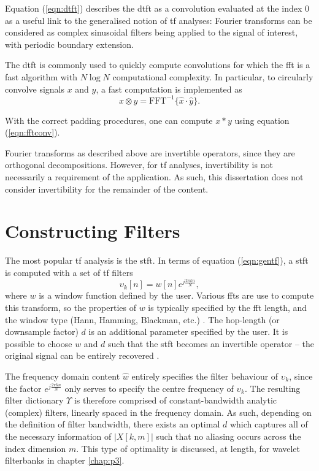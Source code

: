 Equation (\ref{eqn:dtft}) describes the \ac{dtft} as a convolution evaluated at the index 0 as a useful link to the generalised notion of \ac{tf} analyses: Fourier transforms can be considered as complex sinusoidal filters being applied to the signal of interest, with periodic boundary extension.

The \ac{dtft} is commonly used to quickly compute convolutions for which the \ac{fft} is a fast algorithm with $N \log N$ computational complexity. In particular, to circularly convolve signals $x$ and $y$, a fast computation is implemented as
\begin{equation}
    \label{eqn:fftconv}
    x \otimes y = \text{FFT}^{-1}\{\hat{x} \cdot \hat{y}\}.
\end{equation}

With the correct padding procedures, one can compute $x * y$ using equation (\ref{eqn:fftconv}).

Fourier transforms as described above are invertible operators, since they are orthogonal decompositions. However, for \ac{tf} analyses, invertibility is not necessarily a requirement of the application. As such, this dissertation does not consider invertibility for the remainder of the content.


\section{Constructing Filters}
\label{sec:p1i:tfa}

The most popular \ac{tf} analysis is the \ac{stft}. In terms of equation (\ref{eqn:gentf}), a \ac{stft} is computed with a set of \ac{tf} filters
\begin{equation}
    \label{eqn:stftfilter}
    \upsilon_k[n] =  w[n] e^{j \frac{2\pi k n}{N}},
\end{equation}
where $w$ is a window function defined by the user. Various \acp{fft} are use to compute this transform, so the properties of $w$ is typically specified by the \ac{fft} length, and the window type (Hann, Hamming, Blackman, etc.) \citep{dspbook}. The hop-length (or downsample factor) $d$ is an additional parameter specified by the user. It is possible to choose $w$ and $d$ such that the \ac{stft} becomes an invertible operator -- the original signal can be entirely recovered \citep{stftbook}.

The frequency domain content $\hat{w}$ entirely specifies the filter behaviour of $\upsilon_k$, since the factor $e^{j \frac{2\pi k n}{N}}$ only serves to specify the centre frequency of $\upsilon_k$. The resulting filter dictionary $\Upsilon$ is therefore comprised of constant-bandwidth analytic (complex) filters, linearly spaced in the frequency domain. As such, depending on the definition of filter bandwidth, there exists an optimal $d$ which captures all of the necessary information of $|X[k, m]|$ such that no aliasing occurs across the index dimension $m$. This type of optimality is discussed, at length, for wavelet filterbanks in chapter \ref{chap:p3}.

